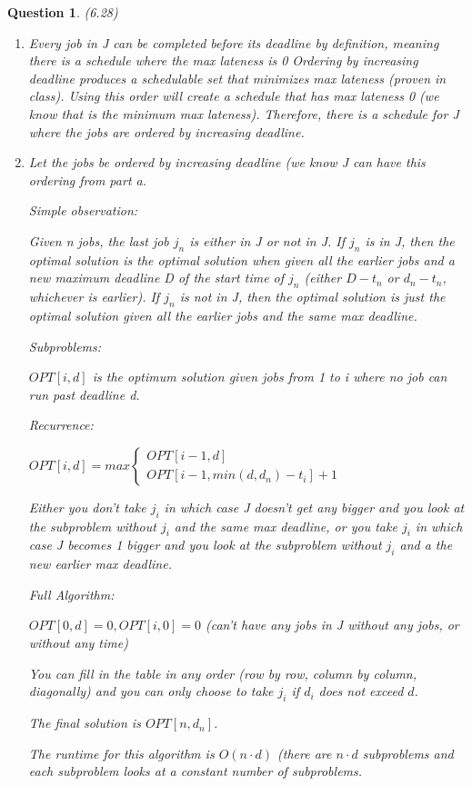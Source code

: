 \documentclass[11pt, oneside]{article}   	%
\newtheorem{Question}{Question}
\begin{document}
\newpage
\linespread{1.1}
\begin{Question} (6.28) 
\renewcommand{\theenumi}{\alph{enumi}}
\begin{enumerate}
\item Every job in J can be completed before its deadline by definition, meaning there is a schedule where the max lateness is 0 Ordering by increasing deadline produces a schedulable set that minimizes max lateness (proven in class). Using this order will create a schedule that has max lateness 0 (we know that is the minimum max lateness). Therefore, there is a schedule for J where the jobs are ordered by increasing deadline. 
\item Let the jobs be ordered by increasing deadline (we know J can have this ordering from part a. \par
Simple observation: \par
Given n jobs, the last job $j_n$ is either in J or not in J. If $j_n$ is in J, then the optimal solution is the optimal solution when given all the earlier jobs and a new maximum deadline D of the start time of $j_n$ (either $D-t_n$ or $d_n-t_n$, whichever is earlier). If $j_n$ is not in J, then the optimal solution is just the optimal solution given all the earlier jobs and the same max deadline. \par
Subproblems: \par
$OPT[i, d]$ is the optimum solution given jobs from 1 to i where no job can run past deadline d. \par
Recurrence: \par
$OPT[i, d]=max\left \{
  \begin{array}{l}
  OPT[i-1,d] \\
  OPT[i-1, min(d,d_n)-t_i] + 1
  \end{array}
  \right.
$\par
Either you don't take $j_i$ in which case J doesn't get any bigger and you look at the subproblem without $j_i$ and the same max deadline, or you take $j_i$ in which case J becomes 1 bigger and you look at the subproblem without $j_i$ and a the new earlier max deadline. \par
Full Algorithm:\par
$OPT[0,d]=0, OPT[i,0]=0$ (can't have any jobs in J without any jobs, or without any time) \par
You can fill in the table in any order (row by row, column by column, diagonally) and you can only choose to take $j_i$ if $d_i$ does not exceed $d$. \par
The final solution is $OPT[n,d_n]$. \par
The runtime for this algorithm is $O(n\cdot d)$ (there are $n \cdot d$ subproblems and each subproblem looks at a constant number of subproblems. 
\end{enumerate}
\end{Question}
\end{document}
